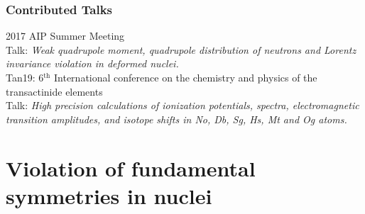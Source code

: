 \documentclass[10pt,a4paper, twoside, openright]{report}
\begin{document}
\section*{Contributed Talks}
2017 AIP Summer Meeting\\
Talk: \textit{Weak quadrupole moment, quadrupole distribution of neutrons and Lorentz invariance violation in deformed nuclei.}\\
\linebreak
Tan19: 6$^{\text{th}}$ International conference on the chemistry and physics of the transactinide elements \\
Talk: \textit{High precision calculations of ionization potentials, spectra, electromagnetic transition amplitudes, and isotope shifts in No, Db, Sg, Hs, Mt and Og atoms.}


\part{Violation of  fundamental symmetries in nuclei}
\end{document}

